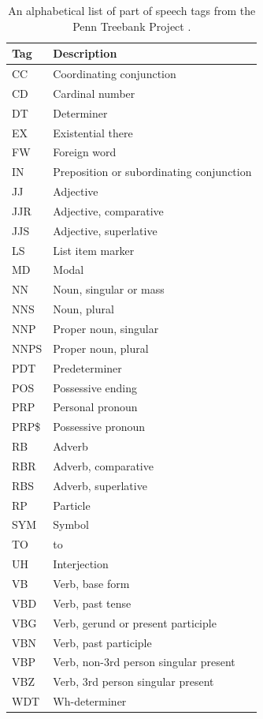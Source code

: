 \documentclass[11pt,openany,executivepaper]{book}
\begin{document}
\begin{table}[htbp]
\tiny
\setlength{\tabcolsep}{3pt}
\renewcommand{\arraystretch}{1}
\begin{center}
\caption{An alphabetical list of part of speech tags from the Penn Treebank Project \cite{259}.}
\begin{tabular}{l|l}
\hline
Tag & Description \\
\hline
CC & Coordinating conjunction \\
CD & Cardinal number \\
DT & Determiner \\
EX & Existential there \\
FW & Foreign word \\
IN & Preposition or subordinating conjunction \\
JJ & Adjective \\
JJR & Adjective, comparative \\
JJS & Adjective, superlative \\
LS & List item marker \\
MD & Modal \\
NN & Noun, singular or mass \\
NNS & Noun, plural \\
NNP & Proper noun, singular \\
NNPS & Proper noun, plural \\
PDT & Predeterminer \\
POS & Possessive ending \\
PRP & Personal pronoun \\
PRP\$ & Possessive pronoun \\
RB & Adverb \\
RBR & Adverb, comparative \\
RBS & Adverb, superlative \\
RP & Particle \\
SYM & Symbol \\
TO & to \\
UH & Interjection \\
VB & Verb, base form \\
VBD & Verb, past tense \\
VBG & Verb, gerund or present participle \\
VBN & Verb, past participle \\
VBP & Verb, non-3rd person singular present \\
VBZ & Verb, 3rd person singular present \\
WDT & Wh-determiner \\

\end{tabular}
\end{center}
\end{table}
\end{document}
